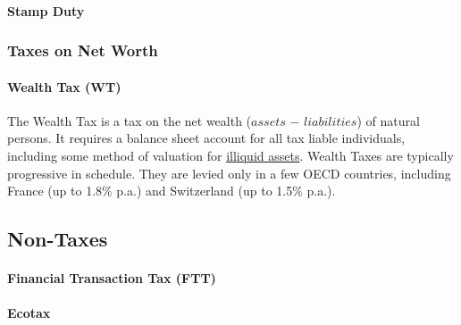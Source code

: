 \paragraph{Stamp Duty}  \label{sec:SD}

\subsubsection{Taxes on Net Worth}

\paragraph{Wealth Tax (WT)}  \label{sec:WT} The Wealth Tax is a tax on the net wealth ($assets$ $-$ $liabilities$) of natural persons. It requires a balance sheet account for all tax liable individuals, including some method of valuation for \hyperref[des:NoIlliquidAssets]{illiquid assets}. Wealth Taxes are typically progressive in schedule. They are levied only in a few OECD countries, including France (up to 1.8\% p.a.) and Switzerland (up to 1.5\% p.a.).



\subsection{Non-Taxes}

\paragraph{Financial Transaction Tax (FTT)}  \label{sec:FTT}

\paragraph{Ecotax}  \label{sec:Ecotax}

